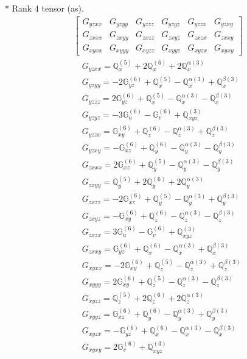 \documentclass[fleqn,8pt,landscape]{jsarticle}
\begin{document}
* Rank 4 tensor (as).
\begin{align*}
\begin{bmatrix} G_{yzxx} & G_{yzyy} & G_{yzzz} & G_{yzyz} & G_{yzzx} & G_{yzxy} \\ G_{zxxx} & G_{zxyy} & G_{zxzz} & G_{zxyz} & G_{zxzx} & G_{zxxy} \\ G_{xyxx} & G_{xyyy} & G_{xyzz} & G_{xyyz} & G_{xyzx} & G_{xyxy} \end{bmatrix}
\end{align*}
\begin{align*}
& G_{yzxx} = \mathbb{Q}_{x}^{(5)} + 2 \mathbb{Q}_{x}^{(6)} + 2 \mathbb{Q}_{x}^{\alpha(3)} \\
& G_{yzyy} = - 2 \mathbb{G}_{yz}^{(6)} + \mathbb{Q}_{x}^{(5)} - \mathbb{Q}_{x}^{\alpha(3)} + \mathbb{Q}_{x}^{\beta(3)} \\
& G_{yzzz} = 2 \mathbb{G}_{yz}^{(6)} + \mathbb{Q}_{x}^{(5)} - \mathbb{Q}_{x}^{\alpha(3)} - \mathbb{Q}_{x}^{\beta(3)} \\
& G_{yzyz} = - 3 \mathbb{G}_{u}^{(6)} - \mathbb{G}_{v}^{(6)} + \mathbb{Q}_{xyz}^{(3)} \\
& G_{yzzx} = \mathbb{G}_{xy}^{(6)} + \mathbb{Q}_{z}^{(6)} - \mathbb{Q}_{z}^{\alpha(3)} + \mathbb{Q}_{z}^{\beta(3)} \\
& G_{yzxy} = - \mathbb{G}_{xz}^{(6)} + \mathbb{Q}_{y}^{(6)} - \mathbb{Q}_{y}^{\alpha(3)} - \mathbb{Q}_{y}^{\beta(3)} \\
& G_{zxxx} = 2 \mathbb{G}_{xz}^{(6)} + \mathbb{Q}_{y}^{(5)} - \mathbb{Q}_{y}^{\alpha(3)} - \mathbb{Q}_{y}^{\beta(3)} \\
& G_{zxyy} = \mathbb{Q}_{y}^{(5)} + 2 \mathbb{Q}_{y}^{(6)} + 2 \mathbb{Q}_{y}^{\alpha(3)} \\
& G_{zxzz} = - 2 \mathbb{G}_{xz}^{(6)} + \mathbb{Q}_{y}^{(5)} - \mathbb{Q}_{y}^{\alpha(3)} + \mathbb{Q}_{y}^{\beta(3)} \\
& G_{zxyz} = - \mathbb{G}_{xy}^{(6)} + \mathbb{Q}_{z}^{(6)} - \mathbb{Q}_{z}^{\alpha(3)} - \mathbb{Q}_{z}^{\beta(3)} \\
& G_{zxzx} = 3 \mathbb{G}_{u}^{(6)} - \mathbb{G}_{v}^{(6)} + \mathbb{Q}_{xyz}^{(3)} \\
& G_{zxxy} = \mathbb{G}_{yz}^{(6)} + \mathbb{Q}_{x}^{(6)} - \mathbb{Q}_{x}^{\alpha(3)} + \mathbb{Q}_{x}^{\beta(3)} \\
& G_{xyxx} = - 2 \mathbb{G}_{xy}^{(6)} + \mathbb{Q}_{z}^{(5)} - \mathbb{Q}_{z}^{\alpha(3)} + \mathbb{Q}_{z}^{\beta(3)} \\
& G_{xyyy} = 2 \mathbb{G}_{xy}^{(6)} + \mathbb{Q}_{z}^{(5)} - \mathbb{Q}_{z}^{\alpha(3)} - \mathbb{Q}_{z}^{\beta(3)} \\
& G_{xyzz} = \mathbb{Q}_{z}^{(5)} + 2 \mathbb{Q}_{z}^{(6)} + 2 \mathbb{Q}_{z}^{\alpha(3)} \\
& G_{xyyz} = \mathbb{G}_{xz}^{(6)} + \mathbb{Q}_{y}^{(6)} - \mathbb{Q}_{y}^{\alpha(3)} + \mathbb{Q}_{y}^{\beta(3)} \\
& G_{xyzx} = - \mathbb{G}_{yz}^{(6)} + \mathbb{Q}_{x}^{(6)} - \mathbb{Q}_{x}^{\alpha(3)} - \mathbb{Q}_{x}^{\beta(3)} \\
& G_{xyxy} = 2 \mathbb{G}_{v}^{(6)} + \mathbb{Q}_{xyz}^{(3)}
\end{align*}
\end{document}
